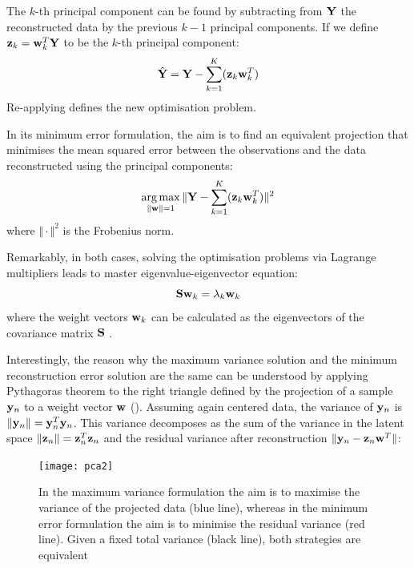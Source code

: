 The $k$-th principal component can be found by subtracting from ${\bf Y}$ the reconstructed data by the previous $k-1$ principal components. If we define ${\bf z}_k={\bf w}_k^T {\bf Y}$ to be the $k$-th principal component:
\[
	\hat{{\bf Y}} = {\bf Y} - \sum_{k=1}^{K} ({\bf z}_k {\bf w}_k^T)
\]
Re-applying  defines the new optimisation problem.

In its minimum error formulation, the aim is to find an equivalent projection that minimises the mean squared error between the observations and the data reconstructed using the principal components:
\[
	\operatorname*{arg\,max}_{\|{\bf w}\|=1} \Vert {\bf Y} - \sum_{k=1}^{K} ({\bf z}_k {\bf w}_k^T) \Vert^{2}
\]
where $\Vert \cdot \Vert^{2}$ is the Frobenius norm.

Remarkably, in both cases, solving the optimisation problems via Lagrange multipliers leads to master eigenvalue-eigenvector equation:
\begin{equation}
	{\bf S} {\bf w}_k = \lambda_k {\bf w}_k
\end{equation}
where the weight vectors ${\bf w}_k$ can be calculated as the eigenvectors of the covariance matrix ${\bf S}$ \cite{Bishop2006}.

Interestingly, the reason why the maximum variance solution and the minimum reconstruction error solution are the same can be understood by applying Pythagoras theorem to the right triangle defined by the projection of a sample ${\bf y}_{n}$ to a weight vector ${\bf w}$ ().
Assuming again centered data, the variance of ${\bf y}_{n}$ is $\|{\bf y}_{n}\| = {\bf y}_{n}^T {\bf y}_{n}$. This variance decomposes as the sum of the variance in the latent space $\|{\bf z}_{n}\| = {\bf z}_{n}^T {\bf z}_{n}$ and the residual variance after reconstruction $\|{\bf y}_{n} - {\bf z}_{n} {\bf w}^T \|$:

\begin{figure}[H]
	\centering
	\texttt{[image: pca2]}
	\caption[Maximizing the variance in the principal component space is equivalent to minimizing the data reconstruction error]{In the maximum variance formulation the aim is to maximise the variance of the projected data (blue line), whereas in the minimum error formulation the aim is to minimise the residual variance (red line). Given a fixed total variance (black line), both strategies are equivalent}
	\label{fig:pca2}
\end{figure}

